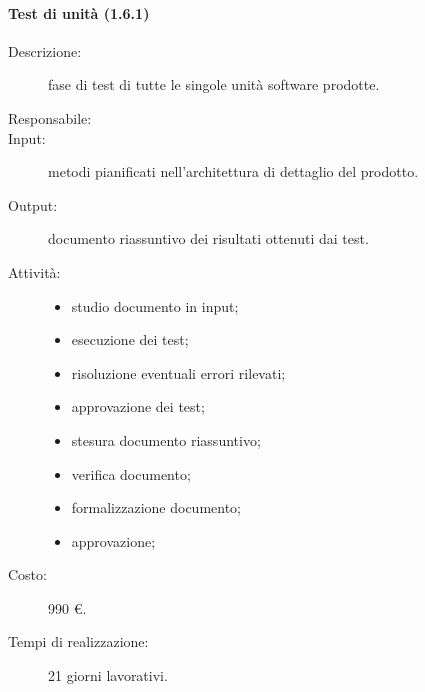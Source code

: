\paragraph{Test di unità (1.6.1)}
\begin{description}
\item[Descrizione:] fase di test di tutte le singole unità software prodotte.
\item[Responsabile:] 
\item[Input:] metodi pianificati nell'architettura di dettaglio del prodotto.
\item[Output:] documento riassuntivo dei risultati ottenuti dai test.
\item[Attività:] 
\begin{center}
\begin{itemize}
\item studio documento in input;
\item esecuzione dei test;
\item risoluzione eventuali errori rilevati;
\item approvazione dei test;
\item stesura documento riassuntivo;
\item verifica documento;
\item formalizzazione documento;
\item approvazione;
\end{itemize}
\end{center}
\item[Costo:] 990 \euro{}.
\item[Tempi di realizzazione:] 21 giorni lavorativi.
\end{description}

